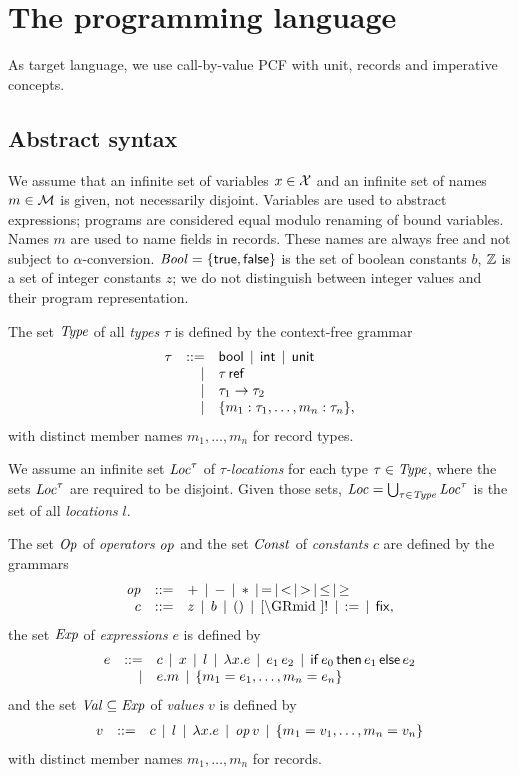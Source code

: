 \documentclass[12pt,a4paper]{report}
\begin{document}

\chapter{The programming language}

As target language, we use call-by-value PCF with unit, records and imperative concepts.



\section{Abstract syntax}

We assume that an infinite set of variables $x \in \mathcal{X}$ and an infinite
set of names $m\in \mathcal{M}$ is given, not necessarily disjoint.
Variables are used to abstract expressions; programs are considered equal modulo
renaming of bound variables. Names $m$ are used to name fields in records. These
names are always free and not subject to $\alpha$-conversion.
$\mathit{Bool} = \{\mathsf{true},\mathsf{false}\}$ is the set of boolean constants $b$,
$\mathbb Z$ is a set of integer constants $z$; we do not distinguish
between integer values and their program representation.

\begin{definition}[Types]
  The set $\mathit{Type}$ of all {\em types} $\tau$ is defined by the context-free grammar
  \[\begin{array}{rrlll}
  \tau & ::= & \mathsf{bool} \,\mid\, \mathsf{int} \,\mid\, \mathsf{unit}
          \\ & \mid & \tau\,\mathsf{ref}
          \\ & \mid & \tau_1\to\tau_2
          \\ & \mid & \{m_1:\tau_1,\ldots,m_n:\tau_n\},
  \end{array}\]
  with distinct member names $m_1,\ldots,m_n$ for record types.
\end{definition}

We assume an infinite set $\mathit{Loc}^\tau$ of {\em $\tau$-locations} for each type $\tau \in \mathit{Type}$,
where the sets $\mathit{Loc}^\tau$ are required to be disjoint. Given those sets,
$\mathit{Loc} = \bigcup_{\tau\in\mathit{Type}} \mathit{Loc}^\tau$ is the set of all {\em locations} $l$.

\begin{definition}[Expressions]
  The set $\mathit{Op}$ of {\em operators} $\mathit{op}$ and the set $\mathit{Const}$ of {\em constants} $c$
  are defined by the grammars
  \[\GRbeg
    \op \GRis + \GRmid - \GRmid * \GRmid = \GRmid < \GRmid > \GRmid \le \GRmid \ge \\
    c \GRis z \GRmid b \GRmid \unit \GRmid \cref \GRmid !
             \GRmid \assign \GRmid \fix,
  \GRend\]
  the set $\mathit{Exp}$ of {\em expressions} $e$ is defined by
  \[\begin{array}{rrlll}
    e & ::= & c \,\mid\, x \,\mid\, l \,\mid\, \lambda x.e \,\mid\, e_1\,e_2
           \,\mid\, \mathsf{if}\,e_0\,\mathsf{then}\,e_1\,\mathsf{else}\,e_2
           \\ & \mid & e.m \,\mid\, \{m_1=e_1,\ldots,m_n=e_n\}
  \end{array}\]
  and the set $\mathit{Val} \subseteq \mathit{Exp}$ of {\em values} $v$ is defined by
  \[\begin{array}{rrlll}
    v & ::= & c \,\mid\, l \,\mid\, \lambda x.e \,\mid\, \mathit{op}\,v \,\mid\, \{m_1=v_1,\ldots,m_n=v_n\}
  \end{array}\]
  with distinct member names $m_1,\ldots,m_n$ for records.
\end{definition}
\end{document}
